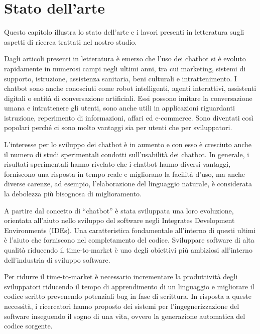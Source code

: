 \chapter{Stato dell'arte} %
%
Questo capitolo illustra lo stato dell’arte e i lavori presenti in letteratura sugli aspetti di ricerca trattati nel nostro studio.

Dagli articoli presenti in letteratura è emerso che l’uso dei chatbot si è evoluto rapidamente in numerosi campi negli ultimi anni, tra cui marketing, sistemi di supporto, istruzione, assistenza sanitaria, beni culturali e intrattenimento. I chatbot sono anche conosciuti come robot intelligenti, agenti interattivi, assistenti digitali o entità di conversazione artificiali.  Essi possono imitare la conversazione umana e intrattenere gli utenti, sono anche utili in applicazioni riguardanti istruzione, reperimento di informazioni, affari ed e-commerce. Sono diventati così popolari perché ci sono molto vantaggi sia per utenti che per sviluppatori. \cite{adamopoulou2020overview}

L’interesse per lo sviluppo dei chatbot è in aumento e con esso è cresciuto anche il numero di studi sperimentali condotti sull’usabilità dei chatbot. 
In generale, i risultati sperimentali hanno rivelato che i chatbot hanno diversi vantaggi, forniscono una risposta in tempo reale e migliorano la facilità d’uso, ma anche diverse carenze, ad esempio, l’elaborazione del linguaggio naturale, è considerata la debolezza più bisognosa di miglioramento.\cite{9687577}

A partire dal concetto di “chatbot” è stata sviluppata una loro evoluzione, orientata all’aiuto nello sviluppo del software negli Integrates Development Environments (IDEs). Una caratteristica fondamentale all’interno di questi ultimi è l’aiuto che forniscono nel completamento del codice. 
Sviluppare software di alta qualità riducendo il time-to-market è uno degli obiettivi più ambiziosi all’interno dell’industria di sviluppo software. 

Per ridurre il time-to-market è necessario incrementare la produttività degli sviluppatori riducendo il tempo di apprendimento di un linguaggio e migliorare il codice scritto prevenendo potenziali bug in fase di scrittura. In risposta a queste necessità, i ricercatori hanno proposto dei sistemi per l’ingegnerizzazione del software inseguendo il sogno di una vita, ovvero la generazione automatica del codice sorgente. \cite{wen2021siri}

